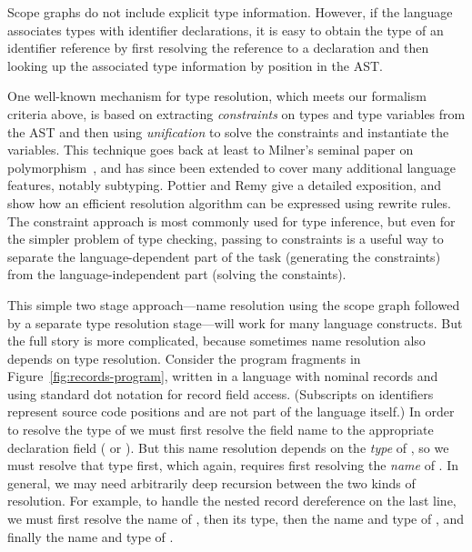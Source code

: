 Scope graphs do not include explicit type information. However, if the language
associates types with identifier declarations, it is easy to obtain the type of
an identifier reference by first resolving the reference to a declaration and
then looking up the associated type information by position in the
AST.


One well-known mechanism for type resolution, which meets our formalism criteria
above, is based on extracting {\it constraints} on types and type variables from
the AST and then using {\it unification} to solve the constraints and
instantiate the variables.
This technique goes back at least to Milner's seminal paper on
polymorphism~\cite{Milner78:0}, and has since been extended to cover many
additional language features, notably subtyping. Pottier and Remy
\cite{Pottier-Remy/emlti} give a detailed exposition, and show how an efficient resolution
algorithm can be expressed using rewrite rules.
The constraint approach is most commonly used for type inference, but even for
the simpler problem of type checking, passing to constraints is a useful way to
separate the language-dependent part of the task (generating the constraints)
from the language-independent part (solving the constaints).

This simple two stage approach---name resolution using the scope graph followed
by a separate type resolution stage---will work for many language constructs.
But the full story is more complicated, because sometimes name resolution also
depends on type resolution.
Consider the program fragments in Figure~\ref{fig:records-program}, written in a
language with nominal records and using standard dot notation for record field
access. 
(Subscripts on identifiers represent source code positions and are not part
of the language itself.)
In order to resolve the type of  we must first resolve the
field name  to the appropriate declaration field ( or
).
But this name resolution depends on the {\it type} of , so we must
resolve that type first, which again, requires first resolving the \emph{name}
of .
In general, we may need arbitrarily deep recursion between the two kinds of
resolution. For example, to handle the nested record dereference on the last
line, we must first resolve the name of , then its type, then the
name and type of , and finally the name and type of
.

